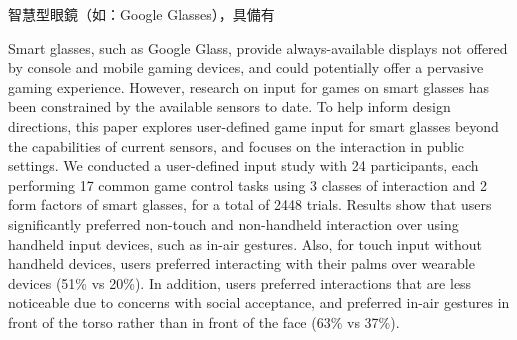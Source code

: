 \begin{abstractzh}
智慧型眼鏡（如：Google Glasses），具備有
\end{abstractzh}

\begin{abstracten}

Smart glasses, such as Google Glass, provide always-available displays not offered by console and mobile gaming devices, and could potentially offer a pervasive gaming experience. 
However, research on input for games on smart glasses has been constrained by the available sensors to date. 
To help inform design directions, this paper explores user-defined game input for smart glasses beyond the capabilities of current sensors, and focuses on the interaction in public settings. 
We conducted a user-defined input study with 24 participants, each performing 17 common game control tasks using 3 classes of interaction and 2 form factors of smart glasses, for a total of 2448 trials. 
Results show that users significantly preferred non-touch and non-handheld interaction over using handheld input devices, such as in-air gestures. Also, for touch input without handheld devices, users preferred interacting with their palms over wearable devices (51\% vs 20\%). 
In addition, users preferred interactions that are less noticeable due to concerns with social acceptance, and preferred in-air gestures in front of the torso rather than in front of the face (63\% vs 37\%). 

\end{abstracten}

\begin{comment}
\category{I2.10}{Computing Methodologies}{Artificial Intelligence --
Vision and Scene Understanding} \category{H5.3}{Information
Systems}{Information Interfaces and Presentation (HCI) -- Game-based
Interaction.}

\terms{Design, Human factors, Performance.}

\keywords{Cooperative game, Body language, Game design, Communication Pattern, Kinect, Human computer interaction.}
\end{comment}
